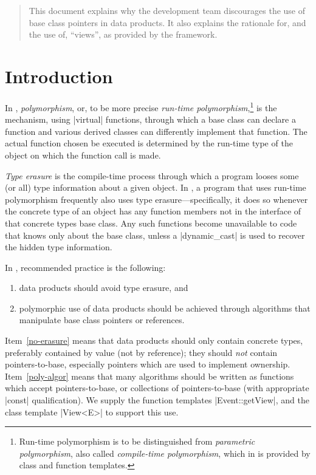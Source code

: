 \documentclass[screen]{memarticle}
\newcommand{\art}{\name{art}\xspace}
\begin{document}
\topmatter
	
\screenflush\begin{abstract}
  This document explains why the \art development team discourages the
  use of base class pointers in data products. It also explains the
  rationale for, and the use of, ``views'', as provided by the \art
  framework.
\end{abstract}

\chapter{Introduction\label{ch:introduction}}

In \cpp, \emph{polymorphism}, or, to be more precise \emph{run-time
  polymorphism},\footnote{Run-time polymorphism is to be distinguished
  from \emph{parametric polymorphism}, also called \emph{compile-time
    polymorphism}, which in \cpp is provided by class and function
  templates.} is the mechanism, using |virtual| functions, through
which a base class can declare a function and various derived classes
can differently implement that function. The actual function chosen be
executed is determined by the run-time type of the object on which the
function call is made.

\emph{Type erasure} is the compile-time process through which a
program looses some (or all) type information about a given object. In
\cpp, a program that uses run-time polymorphism frequently also uses
type erasure---specifically, it does so whenever the concrete type of
an object has any function members not in the interface of that
concrete types base class. Any such functions become unavailable to
code that knows only about the base class, unless a |dynamic_cast| is
used to recover the hidden type information.

In \art, recommended practice is the following:
\begin{enumerate}
  \item\label{no-erasure} data products should avoid type erasure, and
  \item\label{poly-algor} polymorphic use of data products should be achieved through
    algorithms that manipulate base class pointers or references.
\end{enumerate}
Item~\ref{no-erasure} means that data products should only contain
concrete types, preferably contained by value (not by reference); they
should \emph{not} contain pointers-to-base, especially pointers which
are used to implement ownership. Item~\ref{poly-algor} means that many
algorithms should be written as functions which accept
pointers-to-base, or collections of pointers-to-base (with appropriate
|const| qualification). We supply the function templates
|Event::getView|, and the class template |View<E>| to support this
use.
\end{document}
